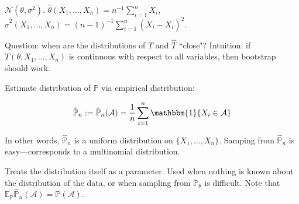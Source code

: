 \begin{example}

 \(\mathcal{N}(\theta, \sigma^2)\). \(\hat{\theta}(X_1, \ldots, X_n)= n^{-1} \sum_{i=1}^n X_i\), \(\hat{\sigma}^2(X_1, \ldots, X_n) = (n-1)^{-1} \sum_{i=1}^n (X_i - \overline{X}_i)^2\). 


\end{example}

Question: when are the distributions of \(T\) and \(\hat{T}\) ``close"? Intuition: if \(T(\theta, X_1, \ldots, X_n)\) is continuous with respect to all variables, then bootstrap should work.

\begin{definition}

Estimate distribution of \(\mathbb{P}\) via empirical distribution:

\[
\hat{\mathbb{P}}_n := \hat{\mathbb{P}}_n(\mathcal{A})  =  \frac{1}{n} \sum_{i=1}^n \mathbbm{1}\{X_i \in \mathcal{A}\} 
\]

In other words, \(\hat{\mathbb{P}}_n \) is a uniform distribution on \(\{X_1, \ldots, X_n\}\). Samping from \(\hat{\mathbb{P}}_n \) is easy---corresponds to a multinomial distribution.

\end{definition}

Treats the distribution itself as a parameter. Used when nothing is known about the distribution of the data, or when sampling from \(\mathbb{P}_\theta\) is difficult. Note that \(\mathbb{E}_{\mathbb{P}}  \hat{\mathbb{P}}_n(\mathcal{A})  = \mathbb{P}(\mathcal{A})\).

